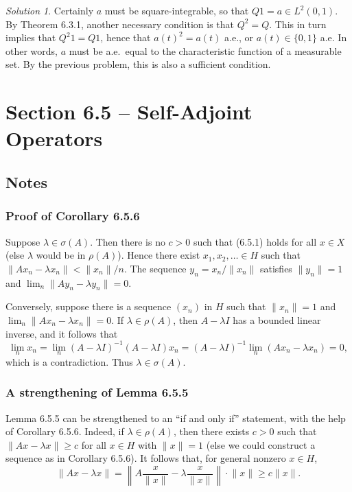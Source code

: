 \documentclass{report}
\newcommand{\norm}[1]{{\lVert #1 \rVert}}
\newcommand{\snorm}[1]{\left\lVert #1 \right\rVert}
\theoremstyle{remark}
\newtheorem*{solution}{Solution}
\begin{document}
\begin{solution}
  Certainly $a$ must be square-integrable, so that $Q1 = a \in L^2(0,1)$. By Theorem 6.3.1, another necessary condition is that $Q^2 = Q$. This in turn implies that $Q^2 1 = Q 1$, hence that $a(t)^2 = a(t)$ a.e., or $a(t) \in \{0,1\}$ a.e. In other words, $a$ must be a.e.\ equal to the characteristic function of a measurable set. By the previous problem, this is also a sufficient condition.
\end{solution}


\section*{Section 6.5 -- Self-Adjoint Operators}

\subsection*{Notes}

\subsubsection*{Proof of Corollary 6.5.6}
Suppose $\lambda \in \sigma(A)$. Then there is no $c > 0$ such that (6.5.1) holds for all $x \in X$ (else $\lambda$ would be in $\rho(A)$). Hence there exist $x_1, x_2, \dotsc \in H$ such that $\norm{Ax_n - \lambda x_n} < \norm{x_n}/n$. The sequence $y_n = x_n/\norm{x_n}$ satisfies $\norm{y_n} = 1$ and $\lim_n \norm{Ay_n - \lambda y_n} = 0$.

Conversely, suppose there is a sequence $(x_n)$ in $H$ such that $\norm{x_n} = 1$ and $\lim_n \norm{Ax_n - \lambda x_n} = 0$. If $\lambda \in \rho(A)$, then $A - \lambda I$ has a bounded linear inverse, and it follows that
\begin{equation*}
  \lim_n x_n = \lim_n (A - \lambda I)^{-1} (A - \lambda I) x_n = (A - \lambda I)^{-1} \lim_n (Ax_n - \lambda x_n) = 0,
\end{equation*}
which is a contradiction. Thus $\lambda \in \sigma(A)$.

\subsubsection*{A strengthening of Lemma 6.5.5}
Lemma 6.5.5 can be strengthened to an ``if and only if'' statement, with the help of Corollary 6.5.6. Indeed, if $\lambda \in \rho(A)$, then there exists $c > 0$ such that $\norm{Ax - \lambda x} \ge c$ for all $x \in H$ with $\norm x = 1$ (else we could construct a sequence as in Corollary 6.5.6). It follows that, for general nonzero $x \in H$,
\begin{equation*}
  \norm{Ax - \lambda x} = \snorm{A \frac{x}{\norm x} - \lambda \frac{x}{\norm x}} \cdot \norm x \ge c \norm x.
\end{equation*}
\end{document}
